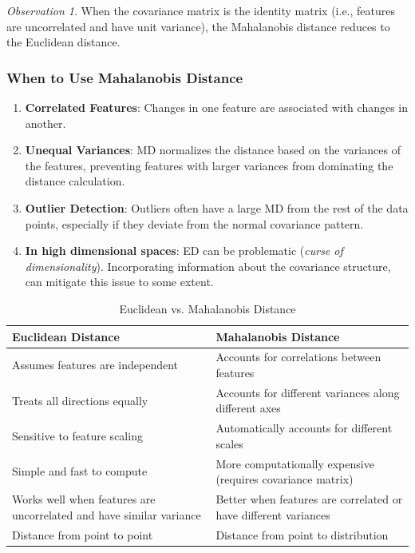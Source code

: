 \documentclass[11pt,a4paper]{article}
\theoremstyle{definition}
\theoremstyle{plain}
\theoremstyle{remark}
\newtheorem*{observation}{Observation}
\begin{document}
\begin{observation}
When the covariance matrix is the identity matrix (i.e., features are uncorrelated and have unit variance), the Mahalanobis distance reduces to the Euclidean distance.
\end{observation}

\subsubsection{When to Use Mahalanobis Distance}

\begin{enumerate}
    \item \textbf{Correlated Features}: Changes in one feature are associated with changes in another.
    
    \item \textbf{Unequal Variances}: MD normalizes the distance based on the variances of the features, preventing features with larger variances from dominating the distance calculation.
    
    \item \textbf{Outlier Detection}: Outliers often have a large MD from the rest of the data points, especially if they deviate from the normal covariance pattern.
    
    \item \textbf{In high dimensional spaces}: ED can be problematic (\textit{curse of dimensionality}). Incorporating information about the covariance structure, can mitigate this issue to some extent.
\end{enumerate}

\begin{table}[h]
\centering
\begin{tabular}{|p{7cm}|p{7cm}|}
\hline
\textbf{Euclidean Distance} & \textbf{Mahalanobis Distance} \\
\hline
Assumes features are independent & Accounts for correlations between features \\
\hline
Treats all directions equally & Accounts for different variances along different axes \\
\hline
Sensitive to feature scaling & Automatically accounts for different scales \\
\hline
Simple and fast to compute & More computationally expensive (requires covariance matrix) \\
\hline
Works well when features are uncorrelated and have similar variance & Better when features are correlated or have different variances \\
\hline
Distance from point to point & Distance from point to distribution \\
\hline
\end{tabular}
\caption{Euclidean vs. Mahalanobis Distance}
\end{table}
\end{document}
